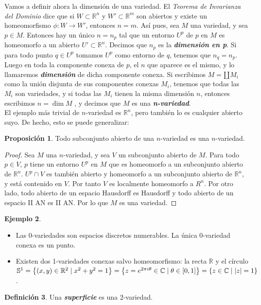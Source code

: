 \documentclass[10pt]{report}
\newcommand{\C}{\mathbb{C}}
\newcommand{\R}{\mathbb{R}}
\DeclareMathOperator{\dimension}{dim} %
\newcommand{\enfatiza}[1]{\textbf{\textit{#1}}}
\theoremstyle{definition}
\newtheorem{defin}{Definición}[section]
\newtheorem{prop}[defin]{Proposición}
\newtheorem{eje}[defin]{Ejemplo}
\begin{document}
Vamos a definir ahora la dimensión de una variedad. El \textit{Teorema de Invarianza del Dominio} dice que si $W\subset \R^n$ y $W'\subset \R^m$ son abiertos y existe un homeomorfismo $\phi: W \rightarrow W'$, entonces $n=m$. Así pues, sea $M$ una variedad, y sea $p\in M$. Entonces hay un único $n=n_p$ tal que un entorno $U^p$ de $p$ en $M$ es homeomorfo a un abierto $U'\subset \R^n$. Decimos que $n_p$ es la \enfatiza{dimensión en p}. Si para todo punto $q\in U^p$ tomamos $U^p$ como entorno de $q$, tenemos que $n_q=n_p$. Luego en toda la componente conexa de $p$, el $n$ que aparece es el mismo, y lo llamaremos \enfatiza{dimensión} de dicha componente conexa. Si escribimos $M=\amalg M_i$ como la unión disjunta de sus componentes conexas $M_i$, tenemos que todas las $M_i$ son variedades, y si todas las $M_i$ tienen la misma dimensión $n$, entonces escribimos $n=\dimension{M}$ , y decimos que $M$ es una \enfatiza{n-variedad}.\\
El ejemplo más trivial de $n$-variedad es $\R^n$, pero también lo es cualquier abierto suyo. De hecho, esto se puede generalizar:
\begin{prop}%
Todo subconjunto abierto de una $n$-variedad es una $n$-variedad.
\end{prop}
\begin{proof}
Sea $M$ una $n$-variedad, y sea $V$ un subconjunto abierto de $M$. Para todo $p\in V$, $p$ tiene un entorno $U^p$ en $M$ que es homeomorfo a un subconjunto abierto de $\R^n$. $U^p\cap V$ es también abierto y homeomorfo a un subconjunto abierto de $\R^n$, y está contenido en $V$. Por tanto $V$ es localmente homeomorfo a $R^n$. Por otro lado, todo abierto de un espacio Hausdorff es Hausdorff y todo abierto de un espacio II AN es II AN. Por lo que $M$ es una variedad.
\end{proof}
\begin{eje}%
\begin{itemize}
\item Las 0-variedades son espacios discretos numerables. La única 0-variedad conexa es un punto.
\item Existen dos 1-variedades conexas salvo homeomorfismo: la recta $\R$ y el círculo $\mathbb{S}^1\\
=\left\{(x,y)\in \R^2\mid x^2+y^2=1\right\}=\left\{z=e^{2\pi i\theta}\in \C \mid \theta \in \left[0,1\right] \right\}=\left\{ z\in \C \mid |z|=1\right\}$.
\end{itemize}
\end{eje}
\begin{defin}%
Una \textbf{\emph{superficie}} es una $2$-variedad.
\end{defin}
\end{document}

